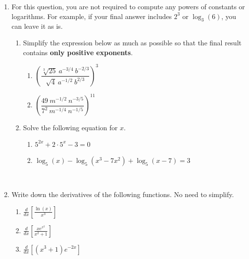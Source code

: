 \documentclass[11pt]{article}
\begin{document}
\begin{enumerate}


\item[\textbf{F2.}]
For this question, you are not required to compute any powers of constants or logarithms.
For example, if your final answer includes $2^3$ or $\log_3(6)$, you can leave it as is.

\begin{enumerate}
\item
Simplify the expression below as much as possible so that the final result contains \textbf{only positive exponents}.
\begin{enumerate}
\item
$\left(\dfrac{\sqrt[3]{25} \ a^{-3/4} \ b^{-2/3}}{\sqrt{4} \ a^{-1/2} \ b^{2/3}}\right)^3$
\vfill
\item
$\left(\dfrac{49 \ m^{-1/2} \ n^{-3/5}}{7^2 \ m^{-1/4} \ n^{-1/5}}\right)^{11}$
\end{enumerate}
\vfill

\item Solve the following equation for $x$. 
\begin{enumerate}
\item
$5^{2x} + 2\cdot 5^x - 3 = 0$
\vfill
\item
$\log_{5}(x) - \log_{5}(x^3-7x^2) + \log_{5}(x - 7) = 3$
\end{enumerate}
~~\vfill
\end{enumerate}



\newpage


\item[\textbf{D2/D3.}]
Write down the derivatives of the following functions.
No need to simplify.
\begin{enumerate}

\item $\displaystyle \frac{d}{dx}\left[ \frac{\ln(x)}{x^3} \right]$
\vfill
\item $\displaystyle \frac{d}{dx}\left[ \frac{x e^{x^2}}{x^2+1} \right]$
\vfill
\item $\displaystyle \frac{d}{dx}\left[ (x^3+1)e^{-2x}\right]$
\vfill
\end{enumerate}



\end{enumerate}
\end{document}

